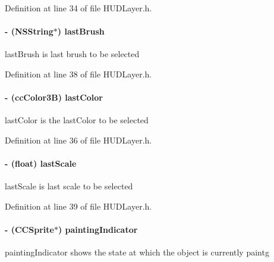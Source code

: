 Definition at line 34 of file H\-U\-D\-Layer.\-h.

\hypertarget{interface_h_u_d_layer_ad7cb8a30419241ee8d2f2813031191be}{
\paragraph[{last\-Brush}]{\setlength{\rightskip}{0pt plus 5cm}-\/ (N\-S\-String$\ast$) last\-Brush\hspace{0.3cm}{\ttfamily [protected]}}}\label{d3/d8a/interface_h_u_d_layer_ad7cb8a30419241ee8d2f2813031191be}
last\-Brush is last brush to be selected 

Definition at line 38 of file H\-U\-D\-Layer.\-h.

\hypertarget{interface_h_u_d_layer_a2d27bf64876ea6f0b2f0d1b9013c1cd7}{
\paragraph[{last\-Color}]{\setlength{\rightskip}{0pt plus 5cm}-\/ (cc\-Color3\-B) last\-Color\hspace{0.3cm}{\ttfamily [protected]}}}\label{d3/d8a/interface_h_u_d_layer_a2d27bf64876ea6f0b2f0d1b9013c1cd7}
last\-Color is the last\-Color to be selected 

Definition at line 36 of file H\-U\-D\-Layer.\-h.

\hypertarget{interface_h_u_d_layer_aedd1d8d2b2d31e203c3242d09390b561}{
\paragraph[{last\-Scale}]{\setlength{\rightskip}{0pt plus 5cm}-\/ (float) last\-Scale\hspace{0.3cm}{\ttfamily [protected]}}}\label{d3/d8a/interface_h_u_d_layer_aedd1d8d2b2d31e203c3242d09390b561}
last\-Scale is last scale to be selected 

Definition at line 39 of file H\-U\-D\-Layer.\-h.

\hypertarget{interface_h_u_d_layer_a67d356e56a82f871b6c5de5818c5985d}{
\paragraph[{painting\-Indicator}]{\setlength{\rightskip}{0pt plus 5cm}-\/ (C\-C\-Sprite$\ast$) painting\-Indicator\hspace{0.3cm}{\ttfamily [protected]}}}\label{d3/d8a/interface_h_u_d_layer_a67d356e56a82f871b6c5de5818c5985d}
painting\-Indicator shows the state at which the object is currently paintg 

